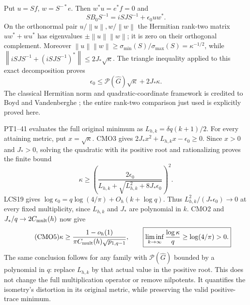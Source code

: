 \documentclass[11pt]{article}
\newcommand{\norm}[1]{\left\lVert#1\right\rVert}
\begin{document}
Put $u=Sf$, $w=S^{-*}e$. Then
$w^*u=e^*f=0$ and
\[
 SB_0S^{-1}=iSJS^{-1}+\epsilon_0uw^*.
\]
On the orthonormal pair $u/\norm u,w/\norm w$ the Hermitian
rank-two matrix $uw^*+wu^*$ has eigenvalues
$\pm\norm u\norm w$; it is zero on their orthogonal complement.
Moreover
$\norm u\norm w\ge\sigma_{\min}(S)/\sigma_{\max}(S)
=\kappa^{-1/2}$, while
$\norm{iSJS^{-1}+(iSJS^{-1})^*}\le2J_*\sqrt\kappa$.
The triangle inequality applied to this exact decomposition proves
\begin{equation}\tag{CMO3}
 \boxed{\epsilon_0\le
       \mathcal P(\widehat G)\sqrt\kappa+2J_*\kappa.}
\end{equation}
The classical Hermitian norm and quadratic-coordinate framework is
credited to Boyd and Vandenberghe \cite[Appendix A.5]{Boyd};
the entire rank-two comparison just used is explicitly proved here.

PT1--41 evaluates the full original minimum as
$L_{h,k}=\delta q(k+1)/2$. For every attaining metric, put
$x=\sqrt\kappa$. CMO3 gives $2J_*x^2+L_{h,k}x-\epsilon_0\ge0$.
Since $x>0$ and $J_*>0$, solving the quadratic with its positive
root and rationalizing proves the finite bound
\begin{equation}\tag{CMO4}
 \boxed{\kappa\ge
 \left(\frac{2\epsilon_0}
 {L_{h,k}+\sqrt{L_{h,k}^2+8J_*\epsilon_0}}\right)^2.}
\end{equation}
LCS19 gives
$\log\epsilon_0=q\log(4/\pi)+O_h(k+\log q)$.
Thus $L_{h,k}^2/(J_*\epsilon_0)\to0$ at every fixed
multiplicity, since $L_{h,k}$ and $J_*$ are polynomial in $k$.
CMO2 and $J_*/q\to2C_{\rm mult}(h)$ now give
\begin{equation}\tag{CMO5}
 \kappa\ge
 \frac{1-o_h(1)}{\pi C_{\rm mult}(h)\sqrt{p_{1,q-1}}},
 \qquad
 \boxed{\liminf_{k\to\infty}\frac{\log\kappa}{q}
                         \ge\log(4/\pi)>0.}
\end{equation}
The same conclusion follows for any family with
$\mathcal P(\widehat G)$ bounded by a polynomial in $q$:
replace $L_{h,k}$ by that actual value in the positive root.
This does not change the full multiplication operator or remove
nilpotents. It quantifies the isometry's distortion in its original
metric, while preserving the valid positive-trace minimum.
\end{document}
